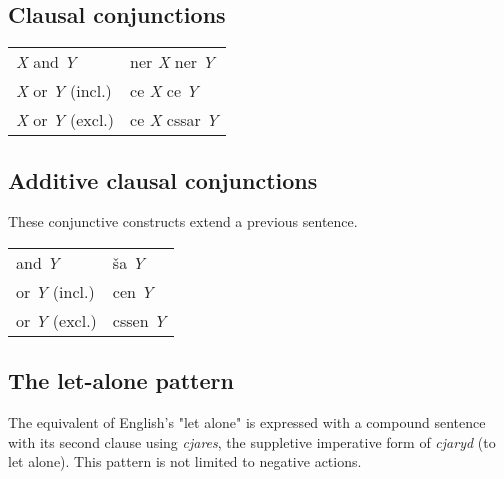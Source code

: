 \documentclass{book}
\begin{document}
\subsection{Clausal conjunctions}

\begin{center}
	\begin{tabular}{|l|l|}
	  \hline
	  \emph{X} and \emph{Y} & ner \emph{X} ner \emph{Y} \\
	  \emph{X} or \emph{Y} (incl.) & ce \emph{X} ce \emph{Y} \\
	  \emph{X} or \emph{Y} (excl.) & ce \emph{X} cssar \emph{Y} \\ \hline
	\end{tabular}
\end{center}

\subsection{Additive clausal conjunctions}

These conjunctive constructs extend a previous sentence.

\begin{center}
	\begin{tabular}{|l|l|}
	  \hline
	  and \emph{Y} & ša \emph{Y} \\
	  or \emph{Y} (incl.) & cen \emph{Y} \\
	  or \emph{Y} (excl.) & cssen \emph{Y} \\ \hline
	\end{tabular}
\end{center}

\subsection{The let-alone pattern}

The equivalent of English's "let alone" is expressed with a compound sentence with its second clause using \emph{cjares}, the suppletive imperative form of \emph{cjaryd} (to let alone). This pattern is not limited to negative actions.

\end{document}
